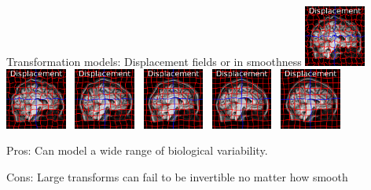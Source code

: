 \documentclass{beamer}
\begin{document}
\begin{frame}{Transformation models: Displacement fields}
or in smoothness
\includegraphics[width=0.15\textwidth]{tform_models_disp_1_4}~
\includegraphics[width=0.15\textwidth]{tform_models_disp_2_4}~
\includegraphics[width=0.15\textwidth]{tform_models_disp_3_4}~
\includegraphics[width=0.15\textwidth]{tform_models_disp_4_4}~
\includegraphics[width=0.15\textwidth]{tform_models_disp_5_4}~
\includegraphics[width=0.15\textwidth]{tform_models_disp_6_4}


\alert{Pros}: Can model a wide range of biological variability.

\alert{Cons}:  Large transforms can fail to be invertible no matter how smooth


\end{frame}
\end{document}
